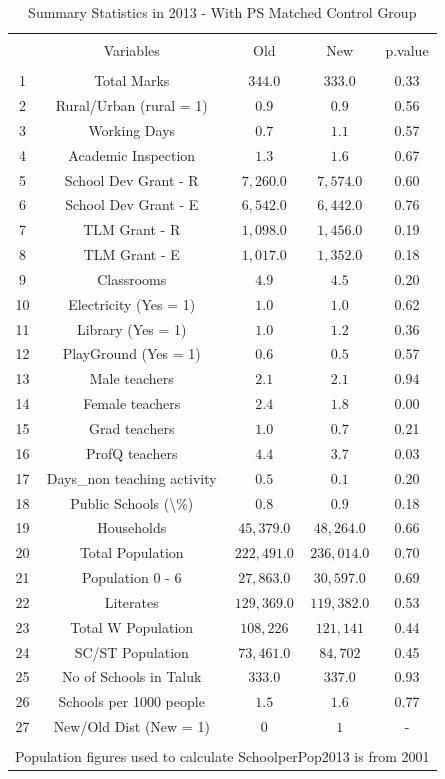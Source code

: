 \documentclass[12pt, a4paper]{article}
\begin{document}
\begin{table}[!htbp] \centering 
  \caption{Summary Statistics in 2013 - With PS Matched Control Group} 
  \label{} 
\begin{tabular}{@{\extracolsep{5pt}} ccccc} 
\\[-1.8ex]\hline 
\hline \\[-1.8ex] 
 & Variables & Old & New & p.value \\ 
\hline \\[-1.8ex] 
1 & Total Marks & $344.0$ & $333.0$ & 0.33 \\ 
2 & Rural/Urban (rural = 1) & $0.9$ & $0.9$ & 0.56 \\ 
3 & Working Days & $0.7$ & $1.1$ & 0.57 \\ 
4 & Academic Inspection & $1.3$ & $1.6$ & 0.67 \\ 
5 & School Dev Grant - R & $7,260.0$ & $7,574.0$ & 0.60 \\ 
6 & School Dev Grant - E & $6,542.0$ & $6,442.0$ & 0.76 \\ 
7 & TLM Grant - R & $1,098.0$ & $1,456.0$ & 0.19 \\ 
8 & TLM Grant - E & $1,017.0$ & $1,352.0$ & 0.18 \\ 
9 & Classrooms & $4.9$ & $4.5$ & 0.20 \\ 
10 & Electricity (Yes = 1) & $1.0$ & $1.0$ & 0.62 \\ 
11 & Library  (Yes = 1) & $1.0$ & $1.2$ & 0.36 \\ 
12 & PlayGround  (Yes = 1) & $0.6$ & $0.5$ & 0.57 \\ 
13 & Male teachers & $2.1$ & $2.1$ & 0.94 \\ 
14 & Female teachers & $2.4$ & $1.8$ & 0.00 \\ 
15 & Grad teachers & $1.0$ & $0.7$ & 0.21 \\ 
16 & ProfQ teachers & $4.4$ & $3.7$ & 0.03 \\ 
17 & Days\_non teaching activity & $0.5$ & $0.1$ & 0.20 \\ 
18 & Public Schools (\textbackslash \%) & $0.8$ & $0.9$ & 0.18 \\ 
19 & Households & $45,379.0$ & $48,264.0$ & 0.66 \\ 
20 & Total Population & $222,491.0$ & $236,014.0$ & 0.70 \\ 
21 & Population 0 - 6 & $27,863.0$ & $30,597.0$ & 0.69 \\ 
22 & Literates & $129,369.0$ & $119,382.0$ & 0.53 \\ 
23 & Total W Population & $108,226$ & $121,141$ & 0.44 \\ 
24 & SC/ST Population & $73,461.0$ & $84,702$ & 0.45 \\ 
25 & No of Schools in Taluk & $333.0$ & $337.0$ & 0.93 \\ 
26 & Schools per 1000 people & $1.5$ & $1.6$ & 0.77 \\ 
27 & New/Old Dist (New = 1) & $0$ & $1$ & - \\ 
\hline \\[-1.8ex] 
\multicolumn{5}{l}{Population figures used to calculate SchoolperPop2013 is from 2001} \\ 
\end{tabular} 
\end{table} \clearpage
\end{document}
